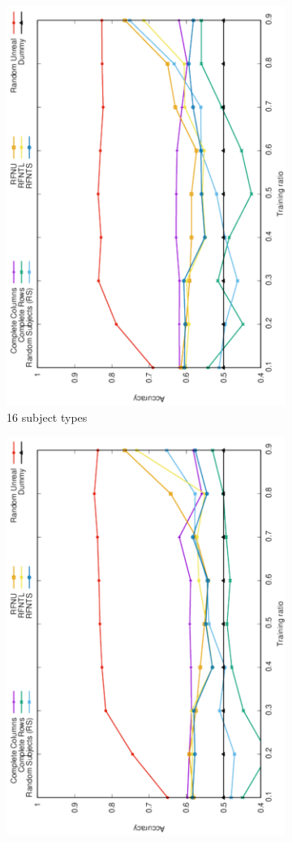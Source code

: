 \documentclass[10pt, conference, compsocconf]{IEEEtran}
\begin{document}
\begin{figure}
\begin{subfigure}[b]{0.4\linewidth}
        \includegraphics[width=0.8\columnwidth, angle=-90]{data/results/means_of_results/ALS-Bias/Synthetic/synthetic_subject_types/ALS-Bias-16-types.pdf}
        \caption{16 subject types}
\end{subfigure}
\begin{subfigure}[b]{0.4\linewidth}
        \includegraphics[width=0.8\columnwidth, angle=-90]{data/results/means_of_results/ALS-Bias/Synthetic/synthetic_subject_types/ALS-Bias-32-types.pdf}

\end{subfigure}
\end{figure}
\end{document}
